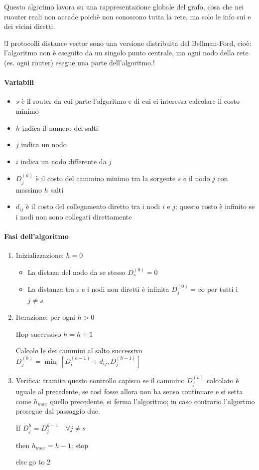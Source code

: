 Questo algorimo lavora su una rappresentazione globale del grafo, cosa che nei ruouter reali non accade poichè non conoscono tutta la rete, ma solo le info sui e dei vicini diretti.

!I protocolli distance vector sono una versione distribuita del Bellman-Ford, cioè: l'algoritmo non è eseguito da un singolo punto centrale, ma ogni nodo della rete (es. ogni router) esegue una parte dell'algoritmo.!


\paragraph{Variabili}
\begin{multicols}{2}
\begin{itemize}
    \item $s$ è il router da cui parte l'algoritmo e di cui ci interessa calcolare il costo minimo
    \item $h$ indica il numero dei salti
    \item $j$ indica un nodo
    \item $i$ indica un nodo differente da $j$
    \item $D_j^{(h)}$ è il costo del cammino minimo tra la sorgente $s$ e il nodo $j$ con massimo $h$ salti
    \item $d_{ij}$ è il costo del collegamento diretto tra i nodi $i$ e $j$; questo costo è infinito se i nodi non sono collegati direttamente
\end{itemize}
\end{multicols}



\paragraph{Fasi dell'algoritmo}
\begin{enumerate}
    \item Inizializzazione: $h = 0$
    \begin{itemize}
        \item La distaza del nodo da se stesso $D_s^{(0)} = 0$
        \item La distanza tra s e i nodi non diretti è infinita $D_j^{(0)} = \infty$ per tutti i $j \neq s$
    \end{itemize}
    \item Iterazione: per ogni $h > 0$

    Hop successivo $h = h + 1$ 

    Calcolo le dei cammini al salto successivo $D_j^{(h)} = \min_i [D_i^{(h-1)} + d_{ij}, D_j^{(h-1)}]$

     \item Verifica: tramite questo controllo capisco se il cammino $D_j^{(h)}$ calcolato è uguale al precedente, se così fosse allora non ha senso continuare e si setta come $h_{max}$ quello precedente, si ferma l'algoritmo; in caso contrario l'algortmo prosegue dal passaggio due. 
     
    If $D_j^{h} = D_j^{h-1} \quad \forall j \neq s$
    
    then $h_{max} = h - 1$; stop
    
    else go to 2
\end{enumerate}
\newpage
